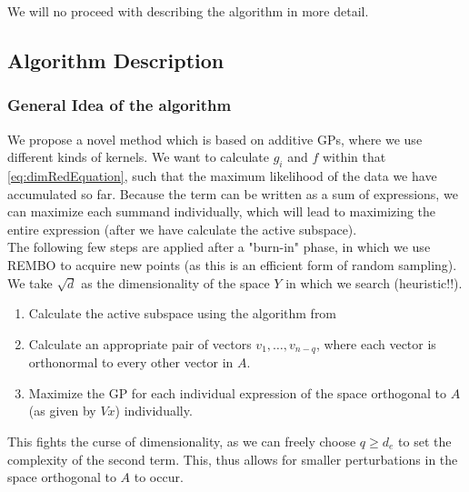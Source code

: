 We will no proceed with describing the algorithm in more detail.

\subsection{Algorithm Description}

\subsubsection{General Idea of the algorithm}

We propose a novel method which is based on additive GPs, where we use different kinds of kernels.
We want to calculate $g_i$ and $f$ within that \ref{eq:dimRedEquation}, such that the maximum likelihood of the data we have accumulated so far.
 Because the term can be written as a sum of expressions, we can maximize each summand individually, which will lead to maximizing the entire expression (after we have calculate the active subspace). \\
 
 The following few steps are applied after a "burn-in" phase, in which we use REMBO to acquire new points (as this is an efficient form of random sampling).
 We take $ \sqrt{d} $ as the dimensionality of the space $Y$ in which we search (heuristic!!).
 
 \begin{enumerate}
 \item Calculate the active subspace using the algorithm from 
 \item Calculate an appropriate pair of vectors $v_1, \ldots, v_{n-{q}}$, where each vector is orthonormal to every other vector in $A$.
 \item Maximize the GP for each individual expression of the space orthogonal to $A$ (as given by $V x$) individually.
 \end{enumerate}
 
 This fights the curse of dimensionality, as we can freely choose $q \geq d_e$ to set the complexity of the second term.
 This, thus allows for smaller perturbations in the space orthogonal to $A$ to occur.

